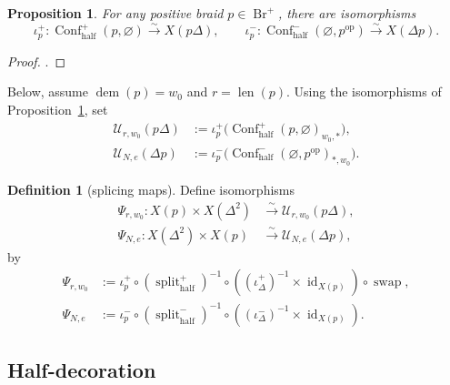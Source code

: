 \documentclass[10pt,a4paper]{article}
\newtheorem{proposition}[theorem]{Proposition}
\theoremstyle{definition}
\newtheorem{definition}[theorem]{Definition}
\theoremstyle{remark}
\newcommand{\Confhalf}{\operatorname{Conf}_{\mathrm{half}}}
\newcommand{\Ucal}{\mathcal U}
\newcommand{\Split}{\operatorname{split}}
\newcommand{\id}{\operatorname{id}}
\newcommand{\len}{\operatorname{len}}
\newcommand{\Br}{\operatorname{Br}}
\begin{document}
\begin{proposition}
\label{prop:delta-extension}
For any positive braid \(p\in\Br^+\), there are isomorphisms
\begin{equation}
 \iota_p^+:
 \Confhalf^+(p,\varnothing)\xrightarrow{\sim}X(p\Delta),
 \qquad
 \iota_p^-:
 \Confhalf^-(\varnothing,p^{\mathrm{op}})\xrightarrow{\sim}X(\Delta p).
 \label{eq:two-delta-extensions}
\end{equation}
\end{proposition}

\begin{proof}
\cite[Lemma~4.4]{GorskyKimScrogginSimental2025}.
\end{proof}

Below, assume \(\operatorname{dem}(p)=w_0\) and \(r=\len(p)\).  Using the
isomorphisms of Proposition~\ref{prop:delta-extension}, set
\begin{equation}
\begin{aligned}
 \Ucal_{r,w_0}(p\Delta)
 &:=\iota_p^+
    \bigl(\Confhalf^+(p,\varnothing)_{w_0,*}\bigr),\\
 \Ucal_{N,e}(\Delta p)
 &:=\iota_p^-
    \bigl(\Confhalf^-(\varnothing,p^{\mathrm{op}})_{*,w_0}\bigr).
\end{aligned}
\label{eq:two-splicing-opens}
\end{equation}

\begin{definition}[splicing maps]
Define isomorphisms
\begin{align*}
 \Psi_{r,w_0}:
 X(p)\times X(\Delta^2)
 &\xrightarrow{\sim}\Ucal_{r,w_0}(p\Delta),\\
 \Psi_{N,e}:
 X(\Delta^2)\times X(p)
 &\xrightarrow{\sim}\Ucal_{N,e}(\Delta p),
\end{align*}
by
\begin{align}
 \Psi_{r,w_0}
 &:=\iota_p^+\circ(\Split_{\mathrm{half}}^+)^{-1}\circ
  ((\iota_{\Delta}^+)^{-1}\times\id_{X(p)})\circ
  \operatorname{swap},
 \label{eq:psi-r-w0}\\
 \Psi_{N,e}
 &:=\iota_p^-\circ(\Split_{\mathrm{half}}^-)^{-1}\circ
  ((\iota_{\Delta}^-)^{-1}\times\id_{X(p)}).
 \label{eq:psi-N-e}
\end{align}
\end{definition}

\subsection{Half-decoration}
\end{document}
